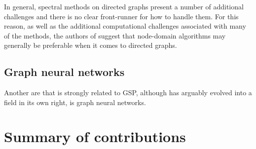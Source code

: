 In general, spectral methods on directed graphs present a number of additional challenges and there is no clear front-runner for how to handle them. For this reason, as well as the additional computational challenges associated with many of the methods, the authors of \cite{Marques2020} suggest that node-domain algorithms may generally be preferable when it comes to directed graphs. 


\subsection{Graph neural networks}

Another are that is strongly related to GSP, although has arguably evolved into a field in its own right, is graph neural networks. 




\section{Summary of contributions}

